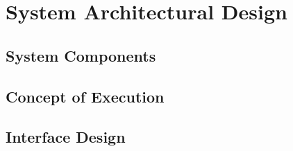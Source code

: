 \chapter{System Architectural Design}

\section{System Components}

\section{Concept of Execution}

\section{Interface Design}

